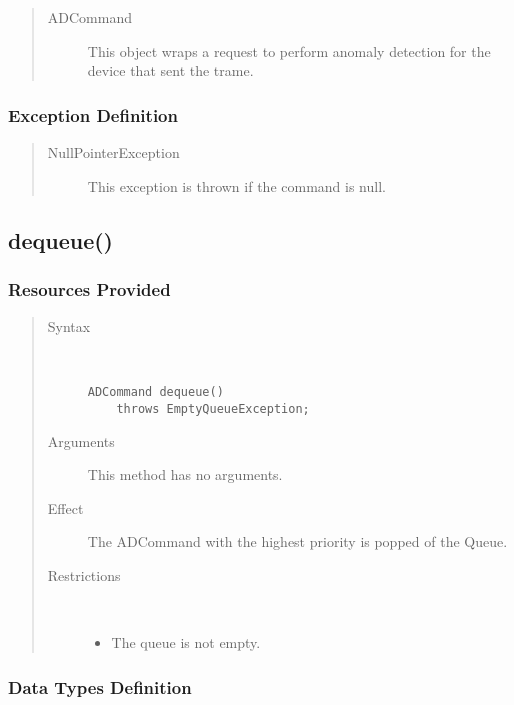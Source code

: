 \begin{quote}
	\begin{description}
		\item[ADCommand] This object wraps a request to perform anomaly detection for
		the device that sent the trame.	
	\end{description} 
\end{quote}

\subsubsection{Exception Definition}

\begin{quote}
	\begin{description}
		\item[NullPointerException] This exception is thrown if the command is null.
	\end{description} 
\end{quote}

\subsection{dequeue()}

\subsubsection{Resources Provided}

\begin{quote}
	\begin{description}
		\item[Syntax] \ 
		\begin{verbatim}
ADCommand dequeue() 
    throws EmptyQueueException;
		\end{verbatim}
		\item[Arguments] This method has no arguments.
		\item[Effect] The ADCommand with the highest priority is popped of the
		Queue.
		\item[Restrictions] \ 
		\begin{itemize}
			\item The queue is not empty. 
		\end{itemize}
	\end{description} 
\end{quote}

\subsubsection{Data Types Definition}

